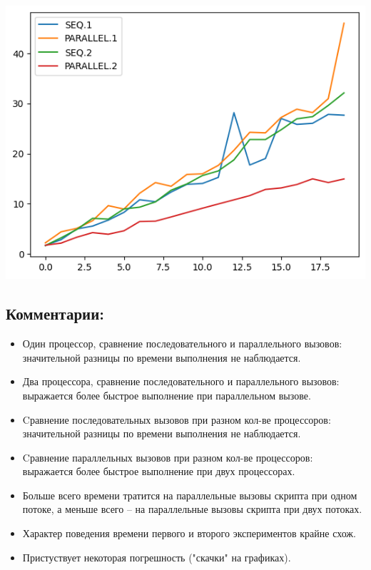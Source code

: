 \documentclass[10pt, a4paper]{article}
\begin{document}
\includegraphics{graphs/10.png}

\subsection*{Комментарии: }
\begin{itemize}
    \item Один процессор, сравнение последовательного и параллельного вызовов: значительной разницы по времени выполнения не наблюдается.
    \item Два процессора, сравнение последовательного и параллельного вызовов: выражается более быстрое выполнение при параллельном вызове. 
    \item Cравнение последовательных вызовов при разном кол-ве процессоров: значительной разницы по времени выполнения не наблюдается.
    \item Cравнение параллельных вызовов при разном кол-ве процессоров: выражается более быстрое выполнение при двух процессорах.
    \item Больше всего времени тратится на параллельные вызовы скрипта при одном потоке, а меньше всего -- на параллельные вызовы скрипта при двух потоках. 
    \item Характер поведения времени первого и второго экспериментов крайне схож. 
    \item Пристуствует некоторая погрешность ("скачки" на графиках).
\end{itemize}
\end{document}
